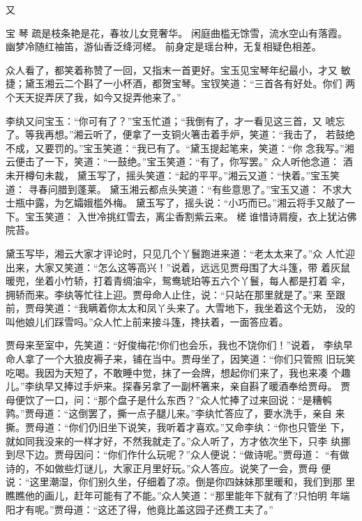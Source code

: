 又

宝
琴
疏是枝条艳是花，春妆儿女竞奢华。
闲庭曲槛无馀雪，流水空山有落霞。
幽梦冷随红袖笛，游仙香泛绛河槎。
前身定是瑶台种，无复相疑色相差。

众人看了，都笑着称赞了一回，又指末一首更好。宝玉见宝琴年纪最小，才又
敏捷；黛玉湘云二个斟了一小杯酒，都贺宝琴。宝钗笑道：“三首各有好处。你们
两个天天捉弄厌了我，如今又捉弄他来了。”

李纨又问宝玉：“你可有了？”宝玉忙道；“我倒有了，才一看见这三首，又
唬忘了。等我再想。”湘云听了，便拿了一支铜火箸击着手炉，笑道：“我击了，
若鼓绝不成，又要罚的。”宝玉笑道：“我已有了。“黛玉提起笔来，笑道：“你
念我写。”湘云便击了一下，笑道：“一鼓绝。”宝玉笑道：“有了，你写罢。”
众人听他念道：
酒未开樽句未裁，
黛玉写了，摇头笑道：“起的平平。”湘云又道：“快着。”宝玉笑道：
寻春问腊到蓬莱。
黛玉湘云都点头笑道：“有些意思了。”宝玉又道：
不求大士瓶中露，为乞孀娥槛外梅。
黛玉写了，摇头说：“小巧而已。”湘云将手又敲了一下。宝玉笑道：
入世冷挑红雪去，离尘香割紫云来。
槎谁惜诗肩瘦，衣上犹沾佛院苔。

黛玉写毕，湘云大家才评论时，只见几个丫鬟跑进来道：“老太太来了。”众
人忙迎出来，大家又笑道：“怎么这等高兴！”说着，远远见贾母围了大斗篷，带
着灰鼠暖兜，坐着小竹轿，打着青绸油伞，鸳鸯琥珀等五六个丫鬟，每人都是打着
伞，拥轿而来。李纨等忙往上迎。贾母命人止住，说：“只站在那里就是了。”来
至跟前，贾母笑道：“我瞒着你太太和凤丫头来了。大雪地下，我坐着这个无妨，
没的叫他娘儿们踩雪吗。”众人忙上前来接斗篷，搀扶着，一面答应着。

贾母来至室中，先笑道：“好俊梅花!你们也会乐，我也不饶你们！”说着，
李纨早命人拿了一个大狼皮褥子来，铺在当中。贾母坐了，因笑道：“你们只管照
旧玩笑吃喝。我因为天短了，不敢睡中觉，抹了一会牌，想起你们来了，我也来凑
个趣儿。”李纨早又捧过手炉来。探春另拿了一副杯箸来，亲自斟了暖酒奉给贾母。
贾母便饮了一口，问：“那个盘子是什么东西？”众人忙捧了过来回说：“是糟鹌
鹑。”贾母道：“这倒罢了，撕一点子腿儿来。”李纨忙答应了，要水洗手，亲自
来撕。贾母道：“你们仍旧坐下说笑，我听着才喜欢。”又命李纨：“你也只管坐
下，就如同我没来的一样才好，不然我就走了。”众人听了，方才依次坐下，只李
纨挪到尽下边。贾母因问：“你们作什么玩呢？”众人便说：“做诗呢。”贾母道：
“有做诗的，不如做些灯谜儿，大家正月里好玩。”众人答应。说笑了一会，贾母
便说：“这里潮湿，你们别久坐，仔细着了凉。倒是你四妹妹那里暖和，我们到那
里瞧瞧他的画儿，赶年可能有了不能。”众人笑道：“那里能年下就有了?只怕明
年端阳才有呢。”贾母道：“这还了得，他竟比盖这园子还费工夫了。”

